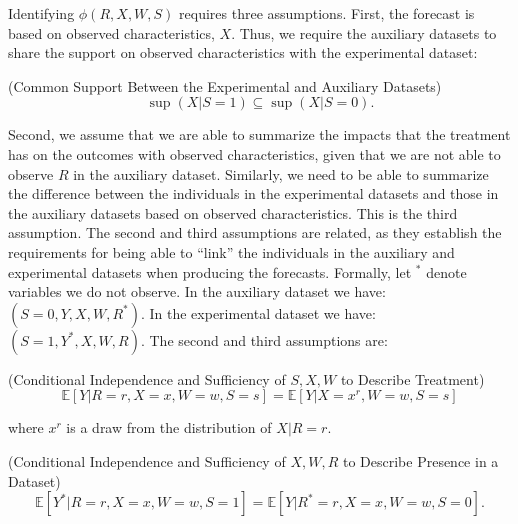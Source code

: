 \noindent Identifying $\phi \left( R, X, W, S \right)$ requires three assumptions. First, the forecast is based on observed characteristics, $X$. Thus, we require the auxiliary datasets to share the support on observed characteristics with the experimental dataset: 

\begin{assumption} \label{ass:support} (Common Support Between the Experimental and Auxiliary Datasets)
\begin{equation}
\sup \left( X | S = 1 \right) \subseteq \sup \left( X | S = 0 \right).
\end{equation}
\end{assumption}

\noindent Second, we assume that we are able to summarize the impacts that the treatment has on the outcomes with observed characteristics, given that we are not able to observe $R$ in the auxiliary dataset. Similarly, we need to be able to summarize the difference between the individuals in the experimental datasets and those in the auxiliary datasets based on observed characteristics. This is the third assumption. The second and third  assumptions are related, as they establish the requirements for being able to ``link'' the individuals in the auxiliary and experimental datasets when producing the forecasts. Formally, let $^{*}$ denote variables we do not observe. In the auxiliary dataset we have: $\left( S = 0, Y, X, W, R^* \right)$. In the experimental dataset we have: $\left( S = 1, Y^*, X, W, R \right)$. The second and third assumptions are:  

\begin{assumption} (Conditional Independence and Sufficiency of $S, X, W$ to Describe Treatment)
\begin{equation}
\mathbb{E} \left[ Y | R = r, X = x, W = w, S = s\right] =  \mathbb{E} \left[ Y | X = x^r, W = w, S = s\right]
\end{equation}

\noindent where $x^r$ is a draw from the distribution of $X | R = r$. 
\end{assumption}

\begin{assumption} (Conditional Independence and Sufficiency of $X, W, R$ to Describe Presence in a Dataset)
\begin{equation}
\mathbb{E} \left[ Y^* | R = r, X = x, W = w, S = 1 \right] = \mathbb{E} \left[ Y | R^* = r , X = x, W = w, S = 0\right]. 
\end{equation}
\end{assumption}

